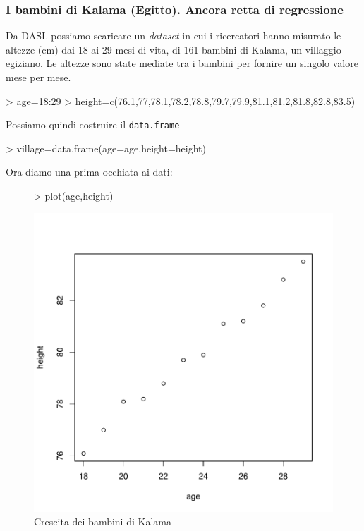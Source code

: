 \documentclass[onecolumn,12pt]{book}
\begin{document}
\subsubsection{I bambini di Kalama (Egitto). Ancora retta di regressione}
Da DASL \cite{DASL} possiamo scaricare un \emph{dataset} in cui i ricercatori hanno misurato le altezze (cm) dai 18 ai 29 mesi di vita, di 161 bambini di Kalama, un villaggio egiziano. Le altezze sono state mediate tra i bambini per fornire un singolo valore mese per mese.
\begin{Schunk}
\begin{Sinput}
> age=18:29
> height=c(76.1,77,78.1,78.2,78.8,79.7,79.9,81.1,81.2,81.8,82.8,83.5)
\end{Sinput}
\end{Schunk}
Possiamo quindi costruire il \texttt{data.frame}
\begin{Schunk}
\begin{Sinput}
> village=data.frame(age=age,height=height)
\end{Sinput}
\end{Schunk}
Ora diamo una prima occhiata ai dati:
\begin{figure}[htbp]
\begin{center}
\begin{Schunk}
\begin{Sinput}
> plot(age,height)
\end{Sinput}
\end{Schunk}
\includegraphics{RbookParte2-134}
\caption{Crescita dei bambini di Kalama}
\label{kalama}
\end{center}
\end{figure}
\end{document}
